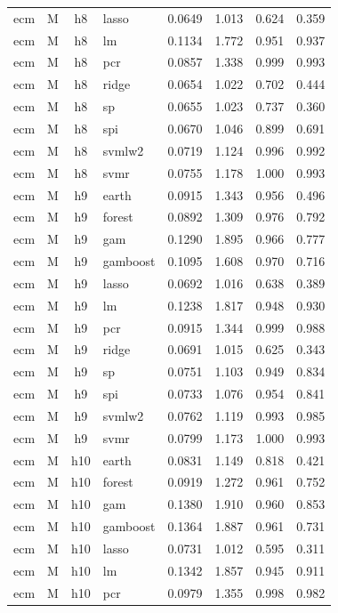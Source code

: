 \begin{ThreePartTable}
\begin{longtable}[t]{llclcccc}
ecm & M & h8 & lasso & 0.0649 & 1.013 & 0.624 & 0.359\\
ecm & M & h8 & lm & 0.1134 & 1.772 & 0.951 & 0.937\\
ecm & M & h8 & pcr & 0.0857 & 1.338 & 0.999 & 0.993\\
ecm & M & h8 & ridge & 0.0654 & 1.022 & 0.702 & 0.444\\
ecm & M & h8 & sp & 0.0655 & 1.023 & 0.737 & 0.360\\
ecm & M & h8 & spi & 0.0670 & 1.046 & 0.899 & 0.691\\
ecm & M & h8 & svmlw2 & 0.0719 & 1.124 & 0.996 & 0.992\\
ecm & M & h8 & svmr & 0.0755 & 1.178 & 1.000 & 0.993\\
\addlinespace
ecm & M & h9 & earth & 0.0915 & 1.343 & 0.956 & 0.496\\
ecm & M & h9 & forest & 0.0892 & 1.309 & 0.976 & 0.792\\
ecm & M & h9 & gam & 0.1290 & 1.895 & 0.966 & 0.777\\
ecm & M & h9 & gamboost & 0.1095 & 1.608 & 0.970 & 0.716\\
ecm & M & h9 & lasso & 0.0692 & 1.016 & 0.638 & 0.389\\
ecm & M & h9 & lm & 0.1238 & 1.817 & 0.948 & 0.930\\
ecm & M & h9 & pcr & 0.0915 & 1.344 & 0.999 & 0.988\\
ecm & M & h9 & ridge & 0.0691 & 1.015 & 0.625 & 0.343\\
ecm & M & h9 & sp & 0.0751 & 1.103 & 0.949 & 0.834\\
ecm & M & h9 & spi & 0.0733 & 1.076 & 0.954 & 0.841\\
ecm & M & h9 & svmlw2 & 0.0762 & 1.119 & 0.993 & 0.985\\
ecm & M & h9 & svmr & 0.0799 & 1.173 & 1.000 & 0.993\\
\addlinespace
ecm & M & h10 & earth & 0.0831 & 1.149 & 0.818 & 0.421\\
ecm & M & h10 & forest & 0.0919 & 1.272 & 0.961 & 0.752\\
ecm & M & h10 & gam & 0.1380 & 1.910 & 0.960 & 0.853\\
ecm & M & h10 & gamboost & 0.1364 & 1.887 & 0.961 & 0.731\\
ecm & M & h10 & lasso & 0.0731 & 1.012 & 0.595 & 0.311\\
ecm & M & h10 & lm & 0.1342 & 1.857 & 0.945 & 0.911\\
ecm & M & h10 & pcr & 0.0979 & 1.355 & 0.998 & 0.982\\

\end{longtable}
\end{ThreePartTable}
